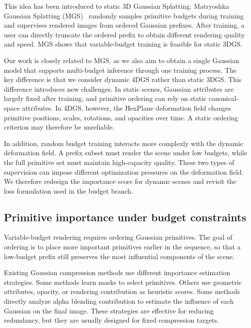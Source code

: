 \documentclass[pdflatex,sn-mathphys]{sn-jnl}
\begin{document}
This idea has been introduced to static 3D Gaussian Splatting. Matryoshka Gaussian Splatting (MGS)~\cite{guo2026matryoshkagaussiansplatting} randomly samples primitive budgets during training and supervises rendered images from ordered Gaussian prefixes. After training, a user can directly truncate the ordered prefix to obtain different rendering quality and speed. MGS shows that variable-budget training is feasible for static 3DGS.

Our work is closely related to MGS, as we also aim to obtain a single Gaussian model that supports multi-budget inference through one training process. The key difference is that we consider dynamic 4DGS rather than static 3DGS. This difference introduces new challenges. In static scenes, Gaussian attributes are largely fixed after training, and primitive ordering can rely on static canonical-space attributes. In 4DGS, however, the HexPlane deformation field changes primitive positions, scales, rotations, and opacities over time. A static ordering criterion may therefore be unreliable.

In addition, random budget training interacts more complexly with the dynamic deformation field. A prefix subset must render the scene under low budgets, while the full primitive set must maintain high-capacity quality. These two types of supervision can impose different optimization pressures on the deformation field. We therefore redesign the importance score for dynamic scenes and revisit the loss formulation used in the budget branch.

\subsection{Primitive importance under budget constraints}

Variable-budget rendering requires ordering Gaussian primitives. The goal of ordering is to place more important primitives earlier in the sequence, so that a low-budget prefix still preserves the most influential components of the scene.

Existing Gaussian compression methods use different importance estimation strategies. Some methods learn masks to select primitives. Others use geometric attributes, opacity, or rendering contribution as heuristic scores. Some methods directly analyze alpha blending contribution to estimate the influence of each Gaussian on the final image. These strategies are effective for reducing redundancy, but they are usually designed for fixed compression targets.
\end{document}
